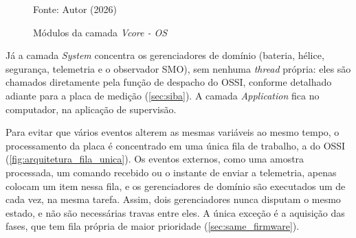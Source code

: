 \begin{figure}[H]
    \centering
    \caption{Módulos da camada \textit{Vcore - OS}}
    \label{fig:Metodologia_Vcore}

    Fonte: Autor (2026)
\end{figure}

Já a camada \textit{System} concentra os gerenciadores de domínio (bateria,
hélice, segurança, telemetria e o observador SMO), sem
nenhuma \textit{thread} própria: eles são chamados diretamente pela função
de despacho do OSSI, conforme detalhado adiante para a placa de medição
(\autoref{sec:siba}). A camada
\textit{Application} fica no computador, na aplicação de supervisão.

Para evitar que vários eventos alterem as mesmas variáveis ao mesmo tempo, o
processamento da placa é concentrado em uma única fila de trabalho, a do OSSI
(\autoref{fig:arquitetura_fila_unica}). Os eventos externos, como uma amostra
processada, um comando recebido ou o instante de enviar a telemetria, apenas
colocam um item nessa fila, e os gerenciadores de domínio são executados um de
cada vez, na mesma tarefa. Assim, dois gerenciadores nunca disputam o mesmo
estado, e não são necessárias travas entre eles. A única exceção é a
aquisição das fases, que tem fila própria de maior prioridade
(\autoref{sec:same_firmware}).

